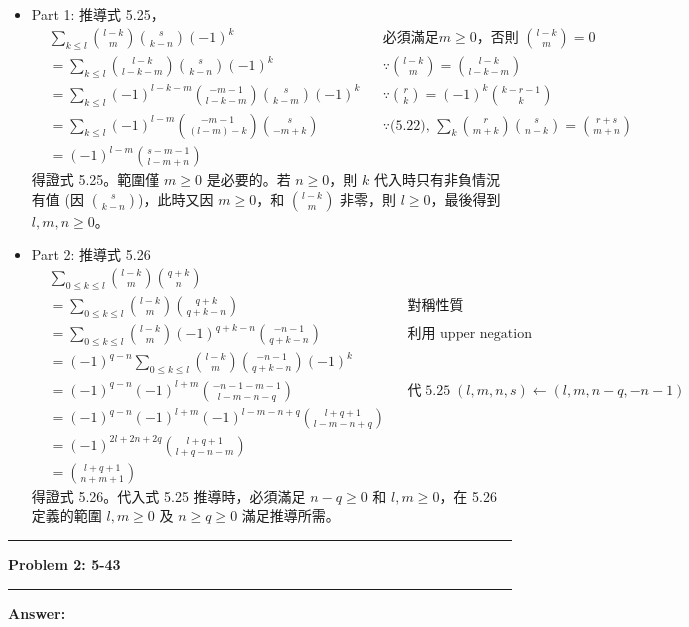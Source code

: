 \documentclass[11pt]{article}
\newcommand\question[2]{\vspace{.25in}\hrule\textbf{#1: #2}\vspace{.5em}\hrule\vspace{.10in}}
\renewcommand\part[1]{\vspace{.10in}\textbf{#1}}
\begin{document}
\begin{itemize}
	\item Part 1: 推導式 5.25，
	\begin{align*}
		& \sum_{k \le l} \binom{l-k}{m} \binom{s}{k-n} (-1)^k 	&& \text{必須滿足} m \ge 0 \text{，否則 } \binom{l-k}{m} = 0 \\
		& = \sum_{k \le l} \binom{l-k}{l-k-m} \binom{s}{k-n} (-1)^k
		&& \because \binom{l-k}{m} = \binom{l-k}{l-k-m} \\
		& = \sum_{k \le l} (-1)^{l-k-m} \binom{-m-1}{l-k-m} \binom{s}{k-m} (-1)^k
		&& \because \binom{r}{k} = (-1)^k \binom{k-r-1}{k} \\
		& = \sum_{k \le l} (-1)^{l-m} \binom{-m-1}{(l-m)-k} \binom{s}{-m+k}
		&& \because \text{(5.22), } \sum_k \binom{r}{m+k} \binom{s}{n-k} = \binom{r+s}{m+n} \\
		& = (-1)^{l-m} \binom{s-m-1}{l-m+n}
	\end{align*}
	得證式 5.25。範圍僅 $m \ge 0$ 是必要的。若 $n \ge 0$，則 $k$ 代入時只有非負情況有值 (因 $\binom{s}{k-n}$)，此時又因 $m \ge 0$，和 $\binom{l-k}{m}$ 非零，則 $l \ge 0$，最後得到 $l, m, n \ge 0$。
	\item Part 2: 推導式 5.26
	\begin{align*}
		& \sum_{0 \le k \le l} \binom{l-k}{m} \binom{q+k}{n} \\
		&= \sum_{0 \le k \le l} \binom{l-k}{m} \binom{q+k}{q+k-n} && \text{對稱性質} \\
		&= \sum_{0 \le k \le l} \binom{l-k}{m} (-1)^{q+k-n}\binom{-n-1}{q+k-n} && \text{利用 upper negation}\\
		&= (-1)^{q-n} \sum_{0 \le k \le l} \binom{l-k}{m} \binom{-n-1}{q+k-n} (-1)^k \\
		&= (-1)^{q-n} (-1)^{l+m} \binom{-n-1-m-1}{l-m-n-q} 
			&& \text{代}\; 5.25 \;
				(l,m,n,s) \leftarrow (l, m, n-q, -n-1)\\
		&= (-1)^{q-n} (-1)^{l+m} (-1)^{l-m-n+q} \binom{l+q+1}{l-m-n+q} \\
		&= (-1)^{2l + 2n + 2q} \binom{l+q+1}{l+q-n-m} \\
		&= \binom{l+q+1}{n+m+1}
	\end{align*}
	得證式 5.26。代入式 5.25 推導時，必須滿足 $n-q \ge 0$ 和 $l, m \ge 0$，在 5.26 定義的範圍 $l, m \ge 0$ 及 $n \ge q \ge 0$ 滿足推導所需。
\end{itemize}

\question{Problem 2} {5-43}

\part{Answer:}
\end{document}

